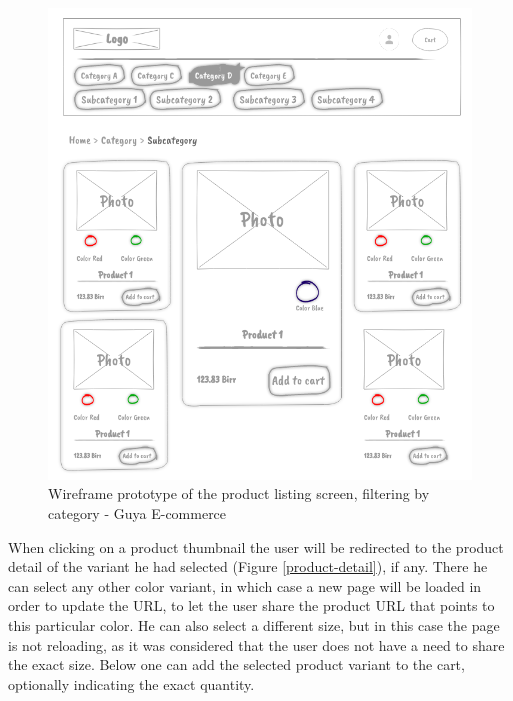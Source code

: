 \begin{figure}[!h]
\center
\includegraphics[keepaspectratio, width=15cm]{wireframes/productlist.png}
\caption{Wireframe prototype of the product listing screen, filtering by category - Guya E-commerce}
\label{display-products}
\end{figure}

When clicking on a product thumbnail the user will be redirected to the product detail of the variant he had selected (Figure \ref{product-detail}), if any. There he can select any other color variant, in which case a new page will be loaded in order to update the URL, to let the user share the product URL that points to this particular color. He can also select a different size, but in this case the page is not reloading, as it was considered that the user does not have a need to share the exact size. Below one can add the selected product variant to the cart, optionally indicating the exact quantity.

